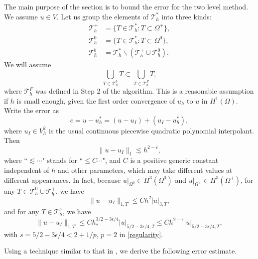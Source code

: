 \documentclass[12pt]{article}
\begin{document}
The main purpose of the section is to bound the error for the two level method. 
We assume $u\in V$.  Let us group the elements of $\mathcal{T}_h^*$ into three kinds:
\begin{align*}
  \mathcal{T}_h^+ &= \{T\in \mathcal{T}_h^*: T \subset \Omega^+\}, \\
  \mathcal{T}_h^0 &= \{T\in \mathcal{T}_h^*: T \subset \Omega^0\}, \\
  \mathcal{T}_h^b &= \mathcal{T}_h^* \backslash(\mathcal{T}_h^+\cup\mathcal{T}_h^0).
\end{align*}
We will assume 
\begin{equation}
 \bigcup_{T\in \mathcal{T}_h^b} T\subset \bigcup_{T\in\mathcal{T}_h^F} T,
\label{assumpT}
\end{equation}
where $\mathcal{T}_h^F$ was defined in Step 2 of the algorithm.
This is a reasonable assumption if $h$ is small enough, given the first order convergence
of $u_h$ to $u$ in $H^1(\Omega)$.  Write the error as
\[e = u - u_h^* = (u - u_I) + (u_I - u_h^*),\]
where $u_I \in V_h^2$ is the usual continuous piecewise quadratic polynomial
interpolant.   Then
\begin{equation}\label{gappro}
\|u-u_I\|_1  \lesssim h^{2-\epsilon},
\end{equation}
where ``$\lesssim\cdots $" stands for ``$\leq C\cdots $", and $C$
is a positive generic constant independent of $h$ and other
parameters, which may take different values at different appearances.
In fact, because $u|_{\Omega^0}\in H^3(\Omega^0)$ and $u|_{\Omega^+}\in H^3(\Omega^+)$, 
for any $T\in \mathcal{T}_h^0\cup\mathcal{T}_h^+$, we have 
\[\|u-u_I\|_{1,T} \leq C h^2 |u|_{3,T},\] 
and for any $T\in \mathcal{T}_h^b$, we have 
\[\|u-u_I\|_{1,T} \leq C h_*^{3/2-3\epsilon/4} |u|_{5/2-3\epsilon/4,T}
 \leq C h^{2-\epsilon} |u|_{5/2-3\epsilon/4,T},\]
with $s=5/2-3\epsilon/4<2+1/p$, $p=2$ in \eqref{regularity}.

Using a technique similar to that in \cite{wang02, wang10}, we derive the following error estimate.
\end{document}

